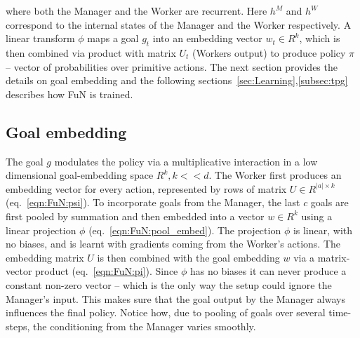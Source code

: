 where both the Manager and the Worker are recurrent. Here $h^M$ and $h^W$ correspond to the internal states of the Manager and the Worker respectively. A linear transform $\phi$ maps a goal $g_t$ into an embedding vector $w_t \in R^k$, which is then combined via product with matrix $U_t$ (Workers output) to produce policy $\pi$ -- vector of probabilities over primitive actions. 
The next section provides the details on goal embedding and the following sections~\ref{sec:Learning},\ref{subsec:tpg} describes how FuN is trained. 

 
\subseckiny
\subsection{Goal embedding}
\subseckiny
\label{subsec:goal_embedding}
The goal $g$ modulates the policy via a multiplicative interaction in a low dimensional goal-embedding space $R^k, k<<d$. The Worker first produces an embedding vector for every action, represented by rows of matrix $U \in R^{|a| \times k}$ (eq.~\ref{eqn:FuN:psi}). 
To incorporate goals from the Manager, the last $c$ goals are first pooled by summation and then embedded into a vector $w \in R^k$ using a linear projection $\phi$ (eq.~\ref{eqn:FuN:pool_embed}). The projection $\phi$ is linear, with no biases, and is learnt with gradients coming from the Worker's actions. The embedding matrix $U$ is then combined with the goal embedding $w$ via a matrix-vector product (eq.~\ref{eqn:FuN:pi}).
Since $\phi$ has no biases it can never produce a constant non-zero vector  -- which is the only way the setup could ignore the Manager's input. This makes sure that the goal output by the Manager always influences the final policy. Notice how, due to pooling of goals over several time-steps, the conditioning from the Manager varies smoothly. 
